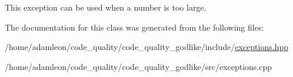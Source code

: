 This exception can be used when a number is too large. 

The documentation for this class was generated from the following files\+:\begin{DoxyCompactItemize}
\item 
/home/adamleon/code\+\_\+quality/code\+\_\+quality\+\_\+godlike/include/\hyperlink{exceptions_8hpp}{exceptions.\+hpp}\item 
/home/adamleon/code\+\_\+quality/code\+\_\+quality\+\_\+godlike/src/exceptions.\+cpp\end{DoxyCompactItemize}
